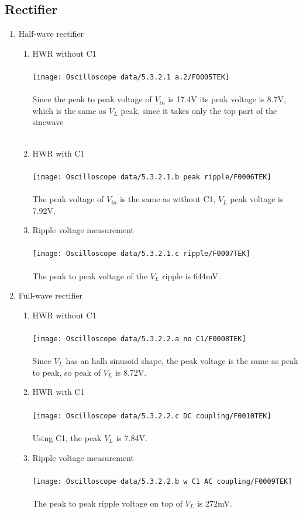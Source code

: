 \documentclass{article}
\begin{document}
			\subsection{Rectifier}
			\begin{enumerate}
				\item Half-wave rectifier
					\begin{enumerate}
						\item HWR without C1\\\\
						\texttt{[image: Oscilloscope data/5.3.2.1 a.2/F0005TEK]}\\\\
						Since the peak to peak voltage of \(V_{in}\) is 17.4V its peak voltage is 8.7V, which is the same as \(V_L\) peak, since it takes only the top part of the sinewave\\\\\pagebreak
						\item  HWR with C1\\\\
						\texttt{[image: Oscilloscope data/5.3.2.1.b peak ripple/F0006TEK]}\\\\
						The peak voltage of \(V_{in}\) is the same as without C1, \(V_L\) peak voltage is 7.92V.
						\item Ripple voltage measurement\\\\
						\texttt{[image: Oscilloscope data/5.3.2.1.c ripple/F0007TEK]}\\\\ 
						The peak to peak voltage of the \(V_L\) ripple is 644mV.\pagebreak
					\end{enumerate}
				\item Full-wave rectifier
					\begin{enumerate}
						\item HWR without C1\\\\
						\texttt{[image: Oscilloscope data/5.3.2.2.a no C1/F0008TEK]}\\\\
						Since \(V_L\) has an halh sinusoid shape, the peak voltage is the same as peak to peak, so peak of \(V_L\) is 8.72V.\\
						\item HWR with C1\\\\
						\texttt{[image: Oscilloscope data/5.3.2.2.c DC coupling/F0010TEK]}\\\\
						Using C1, the peak \(V_L\) is 7.84V.\\
						\item Ripple voltage measurement\\\\
						\texttt{[image: Oscilloscope data/5.3.2.2.b w C1 AC coupling/F0009TEK]}\\\\
						The peak to peak ripple voltage on top of \(V_L\) is 272mV.
					\end{enumerate}	
			\end{enumerate}
\end{document}
